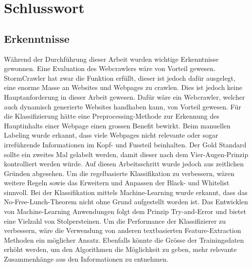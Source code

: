 \chapter{Schlusswort}
\section{Erkenntnisse}
Während der Durchführung dieser Arbeit wurden wichtige Erkenntnisse gewonnen.
Eine Evaluation des Webcrawlers wäre von Vorteil gewesen.
StormCrawler hat zwar die Funktion erfüllt, dieser ist jedoch dafür ausgelegt, eine enorme Masse an Websites und Webpages zu crawlen.
Dies ist jedoch keine Hauptanforderung in dieser Arbeit gewesen.
Dafür wäre ein Webcrawler, welcher auch dynamisch generierte Websites handhaben kann, von Vorteil gewesen.
Für die Klassifizierung hätte eine Preprocessing-Methode zur Erkennung des Hauptinhalts einer Webpage einen grossen Benefit bewirkt.
Beim manuellen Labeling wurde erkannt, dass viele Webpages nicht relevante oder sogar irreführende Informationen im Kopf- und Fussteil beinhalten.
Der Gold Standard sollte ein zweites Mal gelabelt werden, damit dieser nach dem Vier-Augen-Prinzip kontrolliert werden würde.
Auf diesen Arbeitsschritt wurde jedoch aus zeitlichen Gründen abgesehen.
Um die regelbasierte Klassifikation zu verbessern, wären weitere Regeln sowie das Erweitern und Anpassen der Black- und Whitelist sinnvoll.
Bei der Klassifikation mittels Machine-Learning wurde erkannt, dass das \glqq No-Free-Lunch\grqq{}-Theorem nicht ohne Grund aufgestellt worden ist.
Das Entwicklen von Machine-Learning Anwendungen folgt dem Prinzip \glqq Try-and-Error\grqq{} und bietet eine Vielzahl von Stolpersteinen.
Um die Performance der Klassifizierer zu verbessern, wäre die Verwendung von anderen textbasierten Feature-Extraction Methoden ein möglicher Ansatz.
Ebenfalls könnte die Grösse der Trainingsdaten erhöht werden, um den Algorithmen die Möglichkeit zu geben, mehr relevante Zusammenhänge aus den Informationen zu entnehmen.
